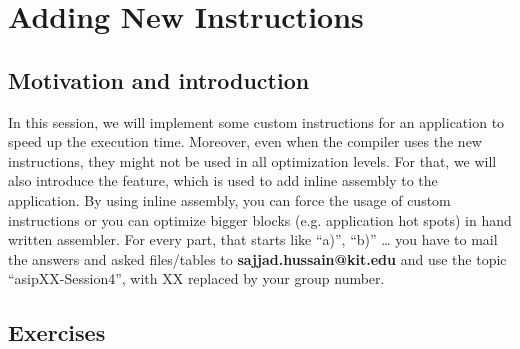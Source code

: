 \hypertarget{adding-new-instructions}{%
\chapter*{Adding New Instructions}\label{adding-new-instructions}}


\section*{Motivation and introduction}

In this session, we will implement some custom instructions for an
application to speed up the execution time. Moreover, even when the
compiler uses the new instructions, they might not be used in all
optimization levels. For that, we will also introduce the feature, which
is used to add inline assembly to the application. By using inline
assembly, you can force the usage of custom instructions or you can
optimize bigger blocks (e.g. application hot spots) in hand written
assembler. For every part, that starts like ``a)'', ``b)'' \ldots{} you
have to mail the answers and asked files/tables to
\textbf{sajjad.hussain@kit.edu} and use the topic ``asipXX-Session4'',
with XX replaced by your group number.

\section*{Exercises}

